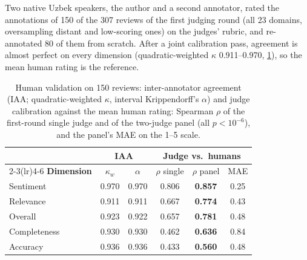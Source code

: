 \documentclass[runningheads]{llncs}
\begin{document}
Two native Uzbek speakers, the author and a second annotator, rated the annotations of 150 of the 307 reviews of the first judging round (all 23 domains, oversampling distant and low-scoring ones) on the judges' rubric, and re-annotated 80 of them from scratch. After a joint calibration pass, agreement is almost perfect on every dimension (quadratic-weighted $\kappa$ 0.911--0.970, \cref{tab:human}), so the mean human rating is the reference.

\begin{table}[t]
\centering
\caption{Human validation on 150 reviews: inter-annotator agreement (IAA; quadratic-weighted $\kappa$, interval Krippendorff's $\alpha$) and judge calibration against the mean human rating: Spearman $\rho$ of the first-round single judge and of the two-judge panel (all $p<10^{-6}$), and the panel's MAE on the 1--5 scale.}
\label{tab:human}
\setlength{\tabcolsep}{6pt}
\footnotesize
\begin{tabular}{@{}lccccc@{}}
\toprule
& \multicolumn{2}{c}{\textbf{IAA}} & \multicolumn{3}{c}{\textbf{Judge vs.\ humans}} \\
\cmidrule(lr){2-3}\cmidrule(lr){4-6}
\textbf{Dimension} & $\kappa_w$ & $\alpha$ & $\rho$ single & $\rho$ panel & MAE \\
\midrule
Sentiment    & 0.970 & 0.970 & 0.806 & \textbf{0.857} & 0.25 \\
Relevance    & 0.911 & 0.911 & 0.667 & \textbf{0.774} & 0.43 \\
Overall      & 0.923 & 0.922 & 0.657 & \textbf{0.781} & 0.48 \\
Completeness & 0.930 & 0.930 & 0.462 & \textbf{0.636} & 0.84 \\
Accuracy     & 0.936 & 0.936 & 0.433 & \textbf{0.560} & 0.48 \\
\bottomrule
\end{tabular}
\end{table}
\end{document}

